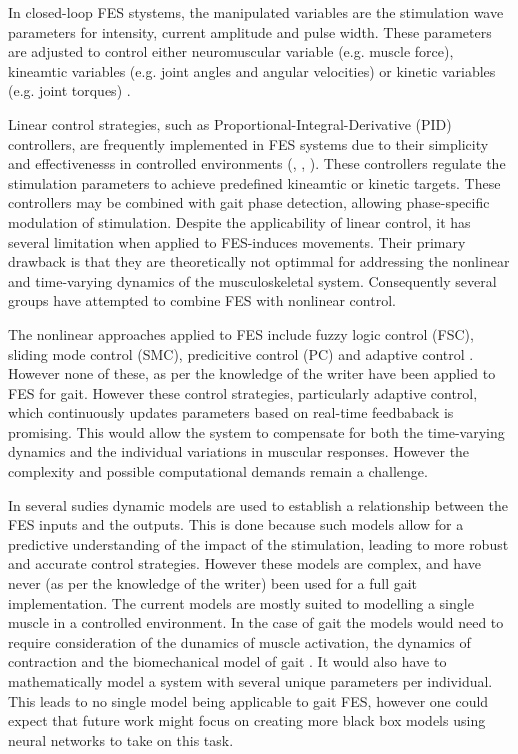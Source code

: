 In closed-loop FES stystems, the manipulated variables are the stimulation wave parameters for intensity, current amplitude and pulse width. These parameters are adjusted to control either neuromuscular variable (e.g. muscle force), kineamtic variables (e.g. joint angles and angular velocities) or kinetic variables (e.g. joint torques) \cite{chaikho_transcutaneous_2022}.

Linear control strategies, such as Proportional-Integral-Derivative (PID) controllers, are frequently implemented in FES systems due to their simplicity and effectivenesss in controlled environments (\cite{chaikho_transcutaneous_2022}, \cite{bouri_closed-loop_2018}, \cite{dodson_experimental_2017}). These controllers regulate the stimulation parameters to achieve predefined kineamtic or kinetic targets. These controllers may be combined with gait phase detection, allowing phase-specific modulation of stimulation. Despite the applicability of linear control, it has several limitation when applied to FES-induces movements. Their primary drawback is that they are theoretically not optimmal for addressing the nonlinear and time-varying dynamics of the musculoskeletal system. Consequently several groups have attempted to combine FES with nonlinear control.

The nonlinear approaches applied to FES include fuzzy logic control (FSC), sliding mode control (SMC), predicitive control (PC) and adaptive control \cite{chaikho_transcutaneous_2022} . However none of these, as per the knowledge of the writer have been applied to FES for gait. However these control strategies, particularly adaptive control, which continuously updates parameters based on real-time feedbaback is promising. This would allow the system to compensate for both the time-varying dynamics and the individual variations in muscular responses. However the complexity and possible computational demands remain a challenge. 

In several sudies  dynamic models are used to establish a relationship between the FES inputs and the outputs. This is done because such models allow for a predictive understanding of the impact of the stimulation, leading to more robust and accurate control strategies. However these models are complex, and have never (as per the knowledge of the writer) been used for a full gait implementation. The current models  are mostly suited to modelling a single muscle in a controlled environment. In the case of gait the models would need to require consideration of the dunamics of muscle activation, the dynamics of contraction and the biomechanical model of gait \cite{chaikho_transcutaneous_2022}. It would also have to mathematically model a system with several unique parameters per individual. This leads to no single model being applicable to gait FES, however one could expect that future work might focus on creating more black box models using neural networks to take on this task.

